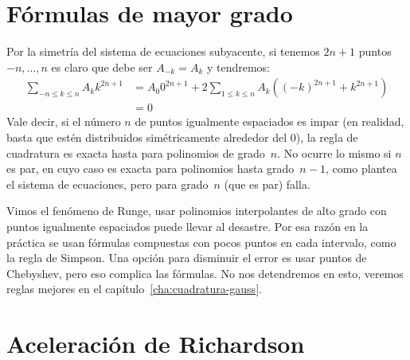 \section{Fórmulas de mayor grado}
\label{sec:cuadratura-alto-grado}

  Por la simetría del sistema de ecuaciones subyacente,
  si tenemos \(2 n + 1\) puntos \(-n, \dotsc, n\)
  es claro que debe ser \(A_{-k} = A_k\)
  y tendremos:
  \begin{align*}
    \sum_{-n \le k \le n} A_k k^{2 n + 1}
      &= A_0 0^{2 n + 1}
          + 2 \sum_{1 \le k \le n} A_k
                \left( (-k)^{2 n + 1} + k^{2 n + 1} \right) \\
      &= 0
  \end{align*}
  Vale decir,
  si el número \(n\) de puntos igualmente espaciados es impar
  (en realidad,
   basta que estén distribuidos simétricamente alrededor del \num{0}),
  la regla de cuadratura es exacta
  hasta para polinomios de grado~\(n\).
  No ocurre lo mismo si \(n\) es par,
  en cuyo caso es exacta para polinomios hasta grado~\(n - 1\),
  como plantea el sistema de ecuaciones,
  pero para grado~\(n\)
  (que es par)
  falla.

  Vimos el fenómeno de Runge,
  usar polinomios interpolantes de alto grado con puntos igualmente espaciados
  puede llevar al desastre.
  Por esa razón en la práctica se usan fórmulas compuestas
  con pocos puntos en cada intervalo,
  como la regla de Simpson.
  Una opción para disminuir el error es usar puntos de Chebyshev,
  pero eso complica las fórmulas.
  No nos detendremos en esto,
  veremos reglas mejores en el capítulo~\ref{cha:cuadratura-gauss}.

\section{Aceleración de Richardson}
\label{sec:richardson-acc}


